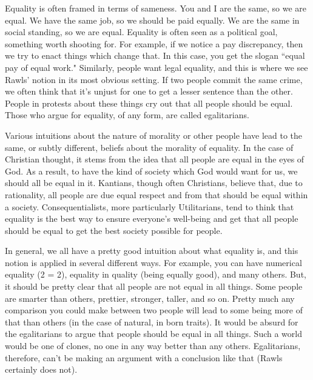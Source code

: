 Equality is often framed in terms of sameness. You and I are the same, so we are equal. We have the same job, so we should be paid equally. We are the same in social standing, so we are equal. Equality is often seen as a political goal, something worth shooting for. For example, if we notice a pay discrepancy, then we try to enact things which change that. In this case, you get the slogan ``equal pay of equal work." Similarly, people want legal equality, and this is where we see Rawls' notion in its most obvious setting. If two people commit the same crime, we often think that it's unjust for one to get a lesser sentence than the other. People in protests about these things cry out that all people should be equal. Those who argue for equality, of any form, are called egalitarians.

Various intuitions about the nature of morality or other people have lead to the same, or subtly different, beliefs about the morality of equality.  In the case of Christian thought, it stems from the idea that all people are equal in the eyes of God. As a result, to have the kind of society which God would want for us, we should all be equal in it. Kantians, though often Christians, believe that, due to rationality, all people are due equal respect and from that should be equal within a society. Consequentialists, more particularly Utilitarians, tend to think that equality is the best way to ensure everyone’s well-being and get that all people should be equal to get the best society possible for people.

In general, we all have a pretty good intuition about what equality is, and this notion is applied in several different ways. For example, you can have numerical equality (2 = 2), equality in quality (being equally good), and many others. But, it should be pretty clear that all people are not equal in all things. Some people are smarter than others, prettier, stronger, taller, and so on. Pretty much any comparison you could make between two people will lead to some being more of that than others (in the case of natural, in born traits). It would be absurd for the egalitarians to argue that people should be equal in all things. Such a world would be one of clones, no one in any way better than any others. Egalitarians, therefore, can’t be making an argument with a conclusion like that (Rawls certainly does not).

